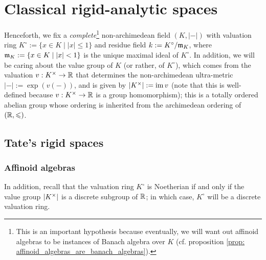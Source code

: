 \section{Classical rigid-analytic spaces}
    \begin{convention} \label{conv: rigid_analytic_varieties_non_archimedean_ground_field}
        Henceforth, we fix a \textit{complete}\footnote{This is an important hypothesis because eventually, we will want out affinoid algebras to be instances of Banach algebra over $K$ (cf. proposition \ref{prop: affinoid_algebras_are_banach_algebras}).} non-archimedean field $(K, |-|)$ with valuation ring $K^{\circ} := \{x \in K \mid |x| \leq 1\}$ and residue field $k := K^{\circ}/\mathfrak{m}_K$, where $\mathfrak{m}_K := \{x \in K \mid |x| < 1\}$ is the unique maximal ideal of $K^{\circ}$. In addition, we will be caring about the value group of $K$ (or rather, of $K^{\circ}$), which comes from the valuation $v: K^{\x} \to \R$ that determines the non-archimedean ultra-metric $|-| := \exp(v(-))$, and is given by $|K^{\x}| := \im v$ (note that this is well-defined because $v: K^{\x} \to \R$ is a group homomorphism); this is a totally ordered abelian group whose ordering is inherited from the archimedean ordering of $(\mathbb{R}, \leqslant)$.
    \end{convention}

    \subsection{Tate's rigid spaces}
        \subsubsection{Affinoid algebras}
            \begin{remark}
                In addition, recall that the valuation ring $K^{\circ}$ is Noetherian if and only if the value group $|K^{\x}|$ is a discrete subgroup of $\mathbb{R}$; in which case, $K^{\circ}$ will be a discrete valuation ring.
            \end{remark}
            
